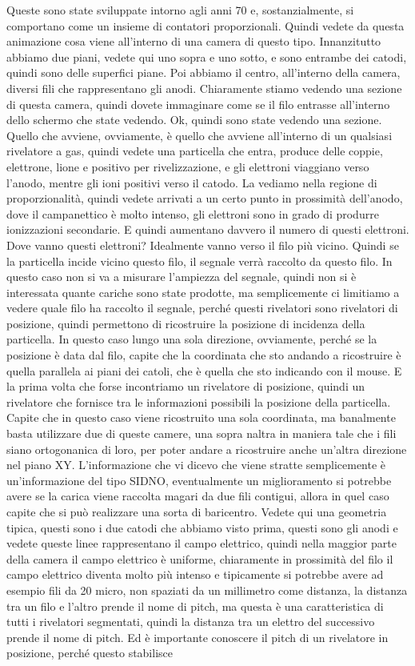 {Queste sono state sviluppate intorno agli anni 70 e, sostanzialmente, si comportano come un insieme di contatori proporzionali. Quindi vedete da questa animazione cosa viene all'interno di una camera di questo tipo. Innanzitutto abbiamo due piani, vedete qui uno sopra e uno sotto, e sono entrambe dei catodi, quindi sono delle superfici piane. Poi abbiamo il centro, all'interno della camera, diversi fili che rappresentano gli anodi. Chiaramente stiamo vedendo una sezione di questa camera, quindi dovete immaginare come se il filo entrasse all'interno dello schermo che state vedendo. Ok, quindi sono state vedendo una sezione. Quello che avviene, ovviamente, è quello che avviene all'interno di un qualsiasi rivelatore a gas, quindi vedete una particella che entra, produce delle coppie, elettrone, lione e positivo per rivelizzazione, e gli elettroni viaggiano verso l'anodo, mentre gli ioni positivi verso il catodo. La vediamo nella regione di proporzionalità, quindi vedete arrivati a un certo punto in prossimità dell'anodo, dove il campanettico è molto intenso, gli elettroni sono in grado di produrre ionizzazioni secondarie. E quindi aumentano davvero il numero di questi elettroni. Dove vanno questi elettroni? Idealmente vanno verso il filo più vicino. Quindi se la particella incide vicino questo filo, il segnale verrà raccolto da questo filo. In questo caso non si va a misurare l'ampiezza del segnale, quindi non si è interessata quante cariche sono state prodotte, ma semplicemente ci limitiamo a vedere quale filo ha raccolto il segnale, perché questi rivelatori sono rivelatori di posizione, quindi permettono di ricostruire la posizione di incidenza della particella. In questo caso lungo una sola direzione, ovviamente, perché se la posizione è data dal filo, capite che la coordinata che sto andando a ricostruire è quella parallela ai piani dei catoli, che è quella che sto indicando con il mouse. E la prima volta che forse incontriamo un rivelatore di posizione, quindi un rivelatore che fornisce tra le informazioni possibili la posizione della particella. Capite che in questo caso viene ricostruito una sola coordinata, ma banalmente basta utilizzare due di queste camere, una sopra naltra in maniera tale che i fili siano ortogonanica di loro, per poter andare a ricostruire anche un'altra direzione nel piano XY. L'informazione che vi dicevo che viene stratte semplicemente è un'informazione del tipo SIDNO, eventualmente un miglioramento si potrebbe avere se la carica viene raccolta magari da due fili contigui, allora in quel caso capite che si può realizzare una sorta di baricentro. Vedete qui una geometria tipica, questi sono i due catodi che abbiamo visto prima, questi sono gli anodi e vedete queste linee rappresentano il campo elettrico, quindi nella maggior parte della camera il campo elettrico è uniforme, chiaramente in prossimità del filo il campo elettrico diventa molto più intenso e tipicamente si potrebbe avere ad esempio fili da 20 micro, non spaziati da un millimetro come distanza, la distanza tra un filo e l'altro prende il nome di pitch, ma questa è una caratteristica di tutti i rivelatori segmentati, quindi la distanza tra un elettro del successivo prende il nome di pitch. Ed è importante conoscere il pitch di un rivelatore in posizione, perché questo stabilisce }

